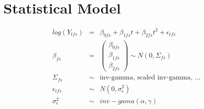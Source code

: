 \documentclass{article}
\begin{document}





\newpage

\section{Statistical Model} 

\begin{eqnarray}
\nonumber log(Y_{tfs}) &=&  \beta_{0fs} + \beta_{1fs}t + \beta_{2fs}t^2 + \epsilon_{tfs}  \\
\nonumber \beta_{fs} &=& \left(\begin{array}{c}
    \beta_{0fs}   \\ 
    \beta_{1fs}  \\ 
    \beta_{2fs}  
\end{array}\right) \sim N(0, \Sigma_{fs}) \\
\nonumber \Sigma_{fs}  &\sim& \mbox{inv-gamma, scaled inv-gamma, ...} \\ 
\nonumber \epsilon_{tfs}  &\sim& N(0,\sigma_{\epsilon}^2) \\
\nonumber \sigma_{\epsilon}^2  &\sim& inv-gama(\alpha,\gamma) \\
\label{mod3}
\end{eqnarray}






\end{document}
